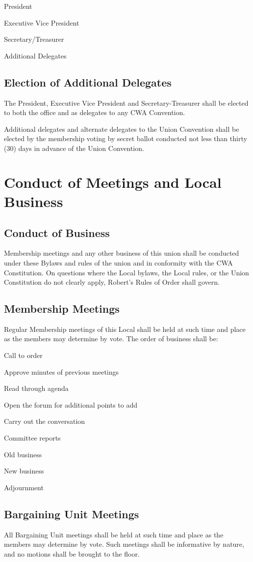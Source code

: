 \documentclass[11pt]{article}
\newcommand{\article}[1]{\vspace{.50cm}\section{#1}}
\newcommand{\articlesection}[1]{\vspace{.25cm}\subsection{#1}}
\begin{document}
\begin{numberlist}
\item President
\item Executive Vice President
\item Secretary/Treasurer
\item Additional Delegates
\end{numberlist}

\articlesection{Election of Additional Delegates}
The President, Executive Vice President and Secretary-Treasurer shall be elected to both the office and as delegates to any CWA Convention.

Additional delegates and alternate delegates to the Union Convention shall be elected by
the membership voting by secret ballot conducted not less than thirty (30) days
in advance of the Union Convention.

\article{Conduct of Meetings and Local Business}\label{conduct-of-meetings}
\articlesection{Conduct of Business}
Membership meetings and any other business of this union shall be conducted under these Bylaws and rules of the union and in conformity with the CWA Constitution. On questions where the Local bylaws, the Local rules, or the Union Constitution do not clearly apply, Robert's Rules of Order shall govern.

\articlesection{Membership Meetings}
Regular Membership meetings of this Local shall be held at such time and place as the members may determine by vote. The order of business shall be:

\begin{numberlist}
\item Call to order
\item Approve minutes of previous meetings
\item Read through agenda
\item Open the forum for additional points to add
\item Carry out the conversation
\item Committee reports
\item Old business
\item New business
\item Adjournment
\end{numberlist}

\articlesection{Bargaining Unit Meetings}
All Bargaining Unit meetings shall be held at such time and place as the members may determine by vote. Such meetings shall be informative by nature, and no motions shall be brought to the floor.
\end{document}
